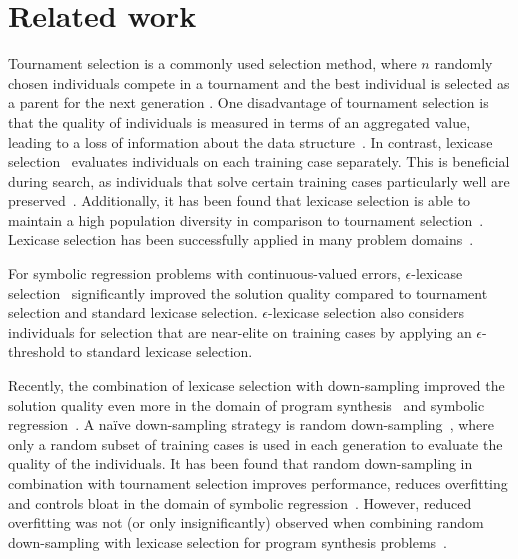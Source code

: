 \section{Related work}
\label{sec:related_work}

Tournament selection is a commonly used selection method, where $n$ randomly chosen individuals compete in a tournament and the best individual is selected as a parent for the next generation \cite{Poli.2008}. One disadvantage of tournament selection is that the quality of individuals is measured in terms of an aggregated value, leading to a loss of information about the data structure~\cite{Krawiec.2014}. In contrast, lexicase selection~\cite{Spector.2012, Helmuth.2014} evaluates individuals on each training case separately. This is beneficial during search, as individuals that solve certain training cases particularly well are preserved~\cite{Helmuth.2019, Helmuth.2020b, Pantridge.2018}. Additionally, it has been found that lexicase selection is able to maintain a high population diversity in comparison to tournament selection~\cite{Helmuth.2016}. Lexicase selection has been successfully applied in many problem domains~\cite{Helmuth.2014, Helmuth.2015, Sobania.2023, sobania2021generalizabilitymeasure, Aenugu.2019, Moore.2017, Moore.2018, ding2021optimizing}. 

For symbolic regression problems with continuous-valued errors, $\epsilon$-lexicase selection~\cite{LaCava.2016, LaCava.2019} significantly improved the solution quality compared to tournament selection and standard lexicase selection. $\epsilon$-lexicase selection also considers individuals for selection that are near-elite on training cases by applying an $\epsilon$-threshold to standard lexicase selection.

Recently, the combination of lexicase selection with down-sampling improved the solution quality even more in the domain of program synthesis~\cite{Hernandez.2019, Ferguson.2020} and symbolic regression~\cite{geiger.2023,geiger2024comprehensive,geiger2024lexicase}. A na\"ive down-sampling strategy is random down-sampling~\cite{Goncalves.2012, gonccalves2011experiments}, where only a random subset of training cases is used in each generation to evaluate the quality of the individuals.
It has been found that random down-sampling in combination with tournament selection improves performance, reduces overfitting and controls bloat in the domain of symbolic regression~\cite{Goncalves.2012, martinez2017comparison}. However, reduced overfitting was not (or only insignificantly) observed when combining random down-sampling with lexicase selection for program synthesis problems~\cite{Helmuth.2021, Schweim.2022}.

